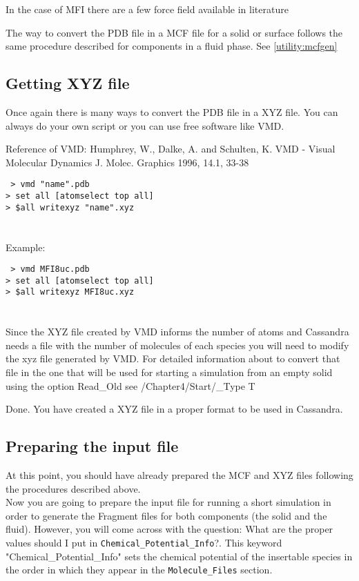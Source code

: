 In the case of MFI there are a few force field available in literature

The way to convert the PDB file in a MCF file for a solid or surface 
follows the same procedure described for components in a fluid phase. See \ref{utility:mcfgen}

\subsection{Getting XYZ file}\label{sec:solid_xyz}

Once again there is many ways to convert the PDB file in a XYZ file. 
You can always do your own script or you can use free software like VMD.

Reference of VMD:
Humphrey, W., Dalke, A. and Schulten, K.
VMD - Visual Molecular Dynamics
J. Molec. Graphics 1996, 14.1, 33-38

\texttt{
> vmd "name".pdb \\
> set all [atomselect top all] \\
> \$all writexyz "name".xyz \\
}
\\ \\

Example:

\texttt{
> vmd MFI8uc.pdb \\
> set all [atomselect top all] \\
> \$all writexyz MFI8uc.xyz \\
}
\\ \\
Since the XYZ file created by VMD informs the number of atoms and Cassandra needs a 
file with the number of molecules of each species you will need to modify the xyz file generated by VMD. 
For detailed information about to convert that file in the one that  will be used for starting a simulation 
from an empty solid using the option Read\_Old see /Chapter4/Start/\_Type  T

Done. You have created a XYZ file in a proper format to be used in Cassandra.

\subsection{Preparing the input file}

At this point, you should have already prepared the MCF and XYZ files following the procedures described above. \\ 

Now you are going to prepare the input file for running a short simulation in order to generate the 
Fragment files for both components (the solid and the fluid). However, 
you will come across with the question: What are the proper values should 
I put in \texttt{Chemical\_Potential\_Info}?. This keyword "Chemical\_Potential\_Info" sets 
the chemical potential of the insertable species in the order in which they 
appear in the \texttt{Molecule\_Files} section. \\ 

